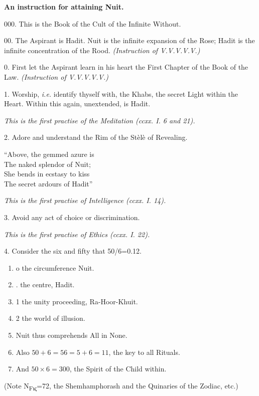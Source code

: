 
\textbf{An instruction for attaining Nuit.}

000. This is the Book of the Cult of the Infinite Without.

00. The Aspirant is Hadit. Nuit is the infinite expansion of the Rose; Hadit is the infinite concentration of the Rood. \textit{(Instruction of V.V.V.V.V.)}

0. First let the Aspirant learn in his heart the First Chapter of the Book of the Law. \textit{(Instruction of V.V.V.V.V.)}

1. Worship, \textit{i.e.} identify thyself with, the Khabs, the secret Light within the Heart. Within this again, unextended, is Hadit.

\textit{This is the first practise of the Meditation (ccxx. I. 6 and 21).}

2. Adore and understand the Rim of the St\`{e}l\`{e} of Revealing.
\begin{quoting}[indentfirst=false]
\enquote{Above, the gemmed azure is \\
The naked splendor of Nuit; \\
She bends in ecstasy to kiss \\
The secret ardours of Hadit}
\end{quoting}

\textit{This is the first practise of Intelligence (ccxx. I. 14).}

3. Avoid any act of choice or discrimination.

\textit{This is the first practise of Ethics (ccxx. I. 22).}

4. Consider the six and fifty that 50/6=0.12. \begin{enumerate}[label={}]
\item o the circumference Nuit.
\item . the centre, Hadit.
\item 1 the unity proceeding, Ra-Hoor-Khuit.
\item 2 the world of illusion.
\item Nuit thus comprehends All in None.
\item Also $50 + 6 = 56 = 5 + 6 = 11$, the key to all Rituals.
\item And $50 \times 6 = 300$, the Spirit of the Child within.
\end{enumerate}

(Note Ν\textsubscript{Fις}=72, the Shemhamphorash and the Quinaries of the Zodiac, etc.)

